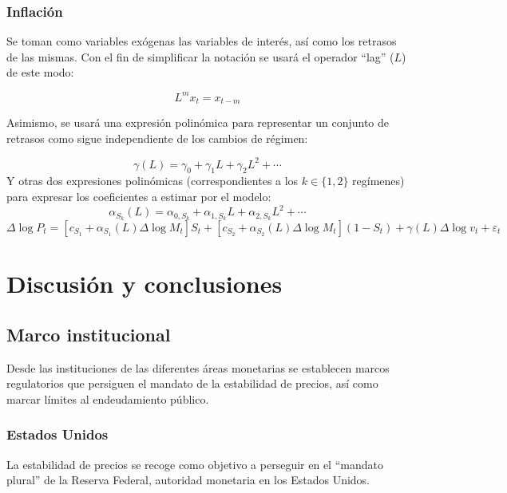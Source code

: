 \documentclass[titlepage, 12pt]{article}
\begin{document}
\subsubsection{Inflación}
Se toman como variables exógenas las variables de interés, así como los retrasos de las mismas. Con el fin de simplificar la notación se usará el operador \enquote{lag} ($L$) de este modo:

\begin{equation}
    L^mx_t=x_{t-m}
\end{equation}

Asimismo, se usará una expresión polinómica para representar un conjunto de retrasos como sigue independiente de los cambios de régimen:

\begin{equation}
    \gamma\left(L\right)=\gamma_0+\gamma_1L+\gamma_2L^2+\cdots
\end{equation}
%
Y otras dos expresiones polinómicas (correspondientes a los $k\in\{1,2\}$ regímenes) para expresar los coeficientes a estimar por el modelo:
%
\begin{equation}
    \alpha_{S_k}\left(L\right)=\alpha_{0,S_k}+\alpha_{1,S_k}L+\alpha_{2,S_k}L^2+\cdots
\end{equation}
\begin{equation}
    \Delta\log{P_t}=\left[c_{S_1}+\alpha_{S_1}\left(L\right)\Delta\log{M_t}\right]S_t+\left[c_{S_2}+\alpha_{S_2}\left(L\right)\Delta\log{M_t}\right]\left(1-S_t\right)+\gamma\left(L\right)\Delta\log{v_t}+\varepsilon_t
    \label{eq:markov-cpi}
\end{equation}

\newpage
\section{Discusión y conclusiones}

\subsection{Marco institucional}
Desde las instituciones de las diferentes áreas monetarias se establecen marcos regulatorios que persiguen el mandato de la estabilidad de precios, así como marcar límites al endeudamiento público.

\subsubsection{Estados Unidos}
La estabilidad de precios se recoge como objetivo a perseguir en el \enquote{mandato plural} de la Reserva Federal, autoridad monetaria en los Estados Unidos.
\end{document}
